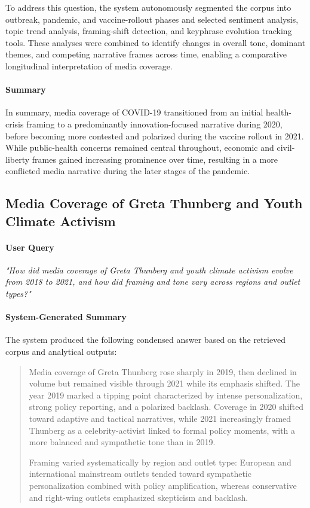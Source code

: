 To address this question, the system autonomously segmented the corpus into outbreak, pandemic, and vaccine-rollout phases and selected sentiment analysis, topic trend analysis, framing-shift detection, and keyphrase evolution tracking tools. These analyses were combined to identify changes in overall tone, dominant themes, and competing narrative frames across time, enabling a comparative longitudinal interpretation of media coverage.

\paragraph{Summary}

In summary, media coverage of COVID-19 transitioned from an initial health-crisis framing to a predominantly innovation-focused narrative during 2020, before becoming more contested and polarized during the vaccine rollout in 2021. While public-health concerns remained central throughout, economic and civil-liberty frames gained increasing prominence over time, resulting in a more conflicted media narrative during the later stages of the pandemic.


\subsection{Media Coverage of Greta Thunberg and Youth Climate Activism}

\paragraph{User Query}

\textit{"How did media coverage of Greta Thunberg and youth climate activism evolve from 2018 to 2021, and how did framing and tone vary across regions and outlet types?"}

\paragraph{System-Generated Summary}

The system produced the following condensed answer based on the retrieved corpus and analytical outputs:

\begin{quote}
Media coverage of Greta Thunberg rose sharply in 2019, then declined in volume but remained visible through 2021 while its emphasis shifted. The year 2019 marked a tipping point characterized by intense personalization, strong policy reporting, and a polarized backlash. Coverage in 2020 shifted toward adaptive and tactical narratives, while 2021 increasingly framed Thunberg as a celebrity-activist linked to formal policy moments, with a more balanced and sympathetic tone than in 2019.

Framing varied systematically by region and outlet type: European and international mainstream outlets tended toward sympathetic personalization combined with policy amplification, whereas conservative and right-wing outlets emphasized skepticism and backlash.
\end{quote}

